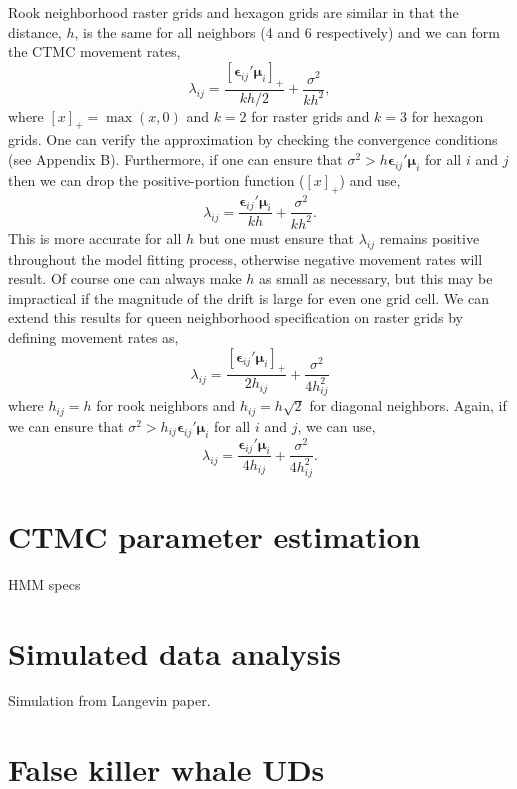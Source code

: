 \documentclass[12pt]{article}
\newcommand{\be}{\ensuremath{\boldsymbol{\epsilon}}}
\newcommand{\bmu}{\ensuremath{\boldsymbol{\mu}}}
\begin{document}
Rook neighborhood raster grids and hexagon grids are similar in that the distance, $h$, is the same for all neighbors (4 and 6 respectively) and we can form the CTMC movement rates, 
\[
\lambda_{ij} = \frac{[\be_{ij}'\bmu_i]_+}{kh/2} + \frac{\sigma^2}{kh^2}, 
\]
where $[x]_+= \max(x, 0)$ and $k = 2$ for raster grids and $k=3$ for hexagon grids. One can verify the approximation by checking the convergence conditions (see Appendix B). Furthermore, if one can ensure that $\sigma^2 > h\be_{ij}'\bmu_i$ for all $i$ and $j$ then we can drop the positive-portion function ($[x]_+$) and use,
\[
\lambda_{ij} = \frac{\be_{ij}'\bmu_i}{kh} + \frac{\sigma^2}{kh^2}.
\]
This is more accurate for all $h$ but one must ensure that $\lambda_{ij}$ remains positive throughout the model fitting process, otherwise negative movement rates will result. Of course one can always make $h$ as small as necessary, but this may be impractical if the magnitude of the drift is large for even one grid cell. We can extend this results for queen neighborhood specification on raster grids by defining movement rates as,
\[
\lambda_{ij}= \frac{[\be_{ij}'\bmu_i]_+}{2h_{ij}} + \frac{\sigma^2}{4h_{ij}^2} 
\]
where $h_{ij}=h$ for rook neighbors and $h_{ij} = h\sqrt{2}$ for diagonal neighbors. Again, if we can ensure that $\sigma^2 > h_{ij} \be_{ij}'\bmu_i$ for all $i$ and $j$, we can use,
\[
\lambda_{ij}= \frac{\be_{ij}'\bmu_i}{4h_{ij}} + \frac{\sigma^2}{4h_{ij}^2}. 
\]
 
\section{CTMC parameter estimation}

HMM specs

\section{Simulated data analysis}

Simulation from Langevin paper. 

\section{False killer whale UDs}
\end{document}
